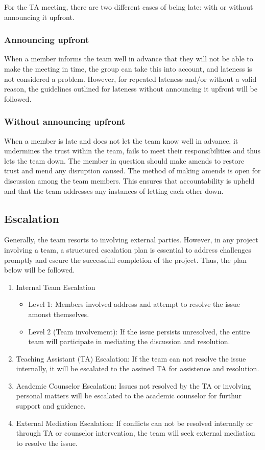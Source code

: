 \documentclass[sigconf,nonacm]{acmart}
\begin{document}
For the TA meeting, there are two different cases of being late: with or without announcing it upfront.

\subsubsection{Announcing upfront}
When a member informs the team well in advance that they will not be able to make the meeting in time, the group can take this into account, and lateness is not considered a problem. However, for repeated lateness and/or without a valid reason, the guidelines outlined for lateness without announcing it upfront will be followed.

\subsubsection{Without announcing upfront}
When a member is late and does not let the team know well in advance, it undermines the trust within the team, fails to meet their responsibilities and thus lets the team down. The member in question should make amends to restore trust and mend any disruption caused. The method of making amends is open for discussion among the team members. This ensures that accountability is upheld and that the team addresses any instances of letting each other down.

\subsection{Escalation}
Generally, the team resorts to involving external parties. However, in any project involving a team, a structured escalation plan is essential to address challenges promptly and escure the successfull completion of the project. Thus, the plan below will be followed.

\begin{enumerate}
    \item Internal Team Escalation
    \begin{itemize}
        \item Level 1: Members involved address and attempt to resolve the issue amonst themselves.
        \item Level 2 (Team involvement): If the issue persists unresolved, the entire team will participate in mediating the discussion and resolution.
    \end{itemize}
    \item Teaching Assistant (TA) Escalation: If the team can not resolve the issue internally, it will be escalated to the assined TA for assistence and resolution.
    \item Academic Counselor Escalation: Issues not resolved by the TA or involving personal matters will be escalated to the academic counselor for furthur support and guidence.
    \item External Mediation Escalation: If conflicts can not be resolved internally or through TA or counselor intervention, the team will seek external mediation to resolve the issue.
\end{enumerate}
\end{document}
